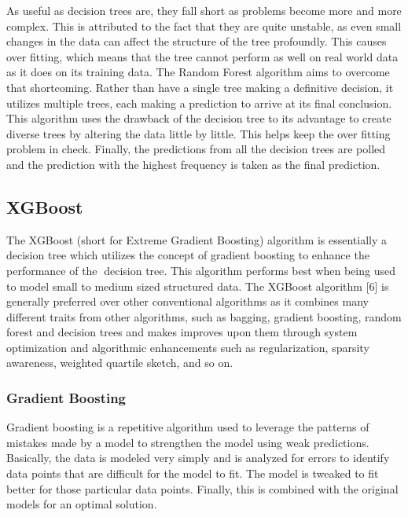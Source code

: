 \documentclass[
]{article}
\begin{document}
As useful as decision trees are, they fall short as problems become more
and more complex. This is attributed to the fact that they are quite
unstable, as even small changes in the data can affect the structure of
the tree profoundly. This causes over fitting, which means that the tree
cannot perform as well on real world data as it does on its training
data. The Random Forest algorithm aims to overcome that shortcoming.
Rather than have a single tree making a definitive decision, it utilizes
multiple trees, each making a prediction to arrive at its final
conclusion. This algorithm uses the drawback of the decision tree to its
advantage to create diverse trees by altering the data little by little.
This helps keep the over fitting problem in check. Finally, the
predictions from all the decision trees are polled and the prediction
with the highest frequency is taken as the final prediction.

\hypertarget{xgboost}{%
\subsection{XGBoost}\label{xgboost}}

The XGBoost (short for Extreme Gradient Boosting) algorithm is
essentially a decision tree which utilizes the concept of gradient
boosting to enhance the performance of the decision tree. This
algorithm performs best when being used to model small to medium sized
structured data. The XGBoost algorithm {[}6{]} is generally preferred
over other conventional algorithms as it combines many different traits
from other algorithms, such as bagging, gradient boosting, random forest
and decision trees and makes improves upon them through system
optimization and algorithmic enhancements such as regularization,
sparsity awareness, weighted quartile sketch, and so on.

\hypertarget{gradient-boosting}{%
\subsubsection{Gradient Boosting}\label{gradient-boosting}}

Gradient boosting is a repetitive algorithm used to leverage the
patterns of mistakes made by a model to strengthen the model using weak
predictions. Basically, the data is modeled very simply and is analyzed
for errors to identify data points that are difficult for the model to
fit. The model is tweaked to fit better for those particular data
points. Finally, this is combined with the original models for an
optimal solution.
\end{document}

